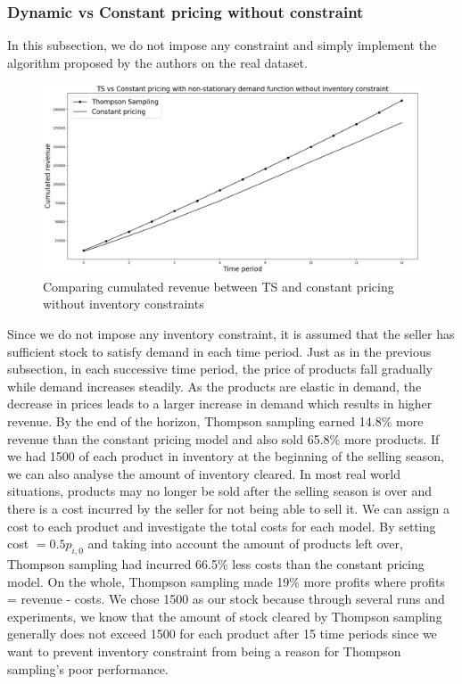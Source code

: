 \documentclass[a4paper]{article}
\begin{document}
\subsubsection{Dynamic vs Constant pricing without constraint}
In this subsection, we do not impose any constraint and simply implement the algorithm proposed by the authors on the real dataset.
\begin{figure}[h]
	\centering
	\includegraphics[width=1.03\textwidth]{512.png}
	\caption{\label{fig:four}Comparing cumulated revenue between TS and constant pricing without inventory constraints}
\end{figure}
\newline
Since we do not impose any inventory constraint, it is assumed that the seller has sufficient stock to satisfy demand in each time period. Just as in the previous subsection, in each successive time period, the price of products fall gradually while demand increases steadily. As the products are elastic in demand, the decrease in prices leads to a larger increase in demand which results in higher revenue.
\newline
\newline
By the end of the horizon, Thompson sampling earned 14.8\% more revenue than the constant pricing model and also sold 65.8\% more products. If we had 1500 of each product in inventory at the beginning of the selling season, we can also analyse the amount of inventory cleared. In most real world situations, products may no longer be sold after the selling season is over and there is a cost incurred by the seller for not being able to sell it. We can assign a cost to each product and investigate the total costs for each model. By setting cost $= 0.5  p_{i,0}$ and taking into account the amount of products left over, Thompson sampling had incurred 66.5\% less costs than the constant pricing model. On the whole, Thompson sampling made 19\% more profits where profits = revenue - costs. We chose 1500 as our stock because through several runs and experiments, we know that the amount of stock cleared by Thompson sampling generally does not exceed 1500 for each product after 15 time periods since we want to prevent inventory constraint from being a reason for Thompson sampling's poor performance.
\end{document}
